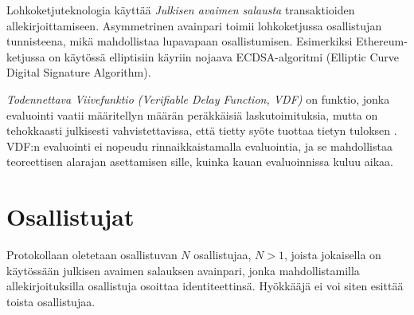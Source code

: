  Lohkoketjuteknologia käyttää \textit{Julkisen avaimen salausta} transaktioiden allekirjoittamiseen. Asymmetrinen avainpari toimii lohkoketjussa osallistujan tunnisteena, mikä mahdollistaa lupavapaan osallistumisen. Esimerkiksi Ethereum-ketjussa on käytössä elliptisiin käyriin nojaava ECDSA-algoritmi (Elliptic Curve Digital Signature Algorithm). 


\textit{Todennettava Viivefunktio (Verifiable Delay Function, VDF)} on funktio, jonka evaluointi vaatii määritellyn määrän peräkkäisiä laskutoimituksia, mutta on tehokkaasti julkisesti vahvistettavissa, että tietty syöte tuottaa tietyn tuloksen \cite{boneh_verifiable_2018}. VDF:n evaluointi ei nopeudu rinnaikkaistamalla evaluointia, ja se mahdollistaa teoreettisen alarajan asettamisen sille, kuinka kauan evaluoinnissa kuluu aikaa.



\section{Osallistujat}

Protokollaan oletetaan osallistuvan $N$ osallistujaa, $N > 1$, joista jokaisella on käytössään julkisen avaimen salauksen avainpari, jonka mahdollistamilla allekirjoituksilla osallistuja osoittaa identiteettinsä. Hyökkääjä ei voi siten esittää toista osallistujaa. 


